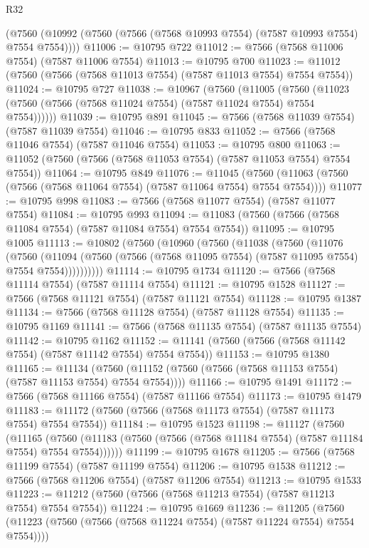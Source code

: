 \begin{lexlean}{R32}
\begin{coremodule}
    (@7560 (@10992 (@7560 (@7566 (@7568 @10993 @7554) (@7587 @10993 @7554) @7554 @7554))))
@11006 := @10795 @722
@11012 := @7566 (@7568 @11006 @7554) (@7587 @11006 @7554)
@11013 := @10795 @700
@11023 := @11012 (@7560 (@7566 (@7568 @11013 @7554) (@7587 @11013 @7554) @7554 @7554))
@11024 := @10795 @727
@11038 := @10967
    (@7560
      (@11005
        (@7560 (@11023 (@7560 (@7566 (@7568 @11024 @7554) (@7587 @11024 @7554) @7554 @7554))))))
@11039 := @10795 @891
@11045 := @7566 (@7568 @11039 @7554) (@7587 @11039 @7554)
@11046 := @10795 @833
@11052 := @7566 (@7568 @11046 @7554) (@7587 @11046 @7554)
@11053 := @10795 @800
@11063 := @11052 (@7560 (@7566 (@7568 @11053 @7554) (@7587 @11053 @7554) @7554 @7554))
@11064 := @10795 @849
@11076 := @11045
    (@7560 (@11063 (@7560 (@7566 (@7568 @11064 @7554) (@7587 @11064 @7554) @7554 @7554))))
@11077 := @10795 @998
@11083 := @7566 (@7568 @11077 @7554) (@7587 @11077 @7554)
@11084 := @10795 @993
@11094 := @11083 (@7560 (@7566 (@7568 @11084 @7554) (@7587 @11084 @7554) @7554 @7554))
@11095 := @10795 @1005
@11113 := @10802
    (@7560
      (@10960
        (@7560
          (@11038
            (@7560
              (@11076
                (@7560
                  (@11094
                    (@7560 (@7566 (@7568 @11095 @7554) (@7587 @11095 @7554) @7554 @7554))))))))))
@11114 := @10795 @1734
@11120 := @7566 (@7568 @11114 @7554) (@7587 @11114 @7554)
@11121 := @10795 @1528
@11127 := @7566 (@7568 @11121 @7554) (@7587 @11121 @7554)
@11128 := @10795 @1387
@11134 := @7566 (@7568 @11128 @7554) (@7587 @11128 @7554)
@11135 := @10795 @1169
@11141 := @7566 (@7568 @11135 @7554) (@7587 @11135 @7554)
@11142 := @10795 @1162
@11152 := @11141 (@7560 (@7566 (@7568 @11142 @7554) (@7587 @11142 @7554) @7554 @7554))
@11153 := @10795 @1380
@11165 := @11134
    (@7560 (@11152 (@7560 (@7566 (@7568 @11153 @7554) (@7587 @11153 @7554) @7554 @7554))))
@11166 := @10795 @1491
@11172 := @7566 (@7568 @11166 @7554) (@7587 @11166 @7554)
@11173 := @10795 @1479
@11183 := @11172 (@7560 (@7566 (@7568 @11173 @7554) (@7587 @11173 @7554) @7554 @7554))
@11184 := @10795 @1523
@11198 := @11127
    (@7560
      (@11165
        (@7560 (@11183 (@7560 (@7566 (@7568 @11184 @7554) (@7587 @11184 @7554) @7554 @7554))))))
@11199 := @10795 @1678
@11205 := @7566 (@7568 @11199 @7554) (@7587 @11199 @7554)
@11206 := @10795 @1538
@11212 := @7566 (@7568 @11206 @7554) (@7587 @11206 @7554)
@11213 := @10795 @1533
@11223 := @11212 (@7560 (@7566 (@7568 @11213 @7554) (@7587 @11213 @7554) @7554 @7554))
@11224 := @10795 @1669
@11236 := @11205
    (@7560 (@11223 (@7560 (@7566 (@7568 @11224 @7554) (@7587 @11224 @7554) @7554 @7554))))

\end{coremodule}
\end{lexlean}
